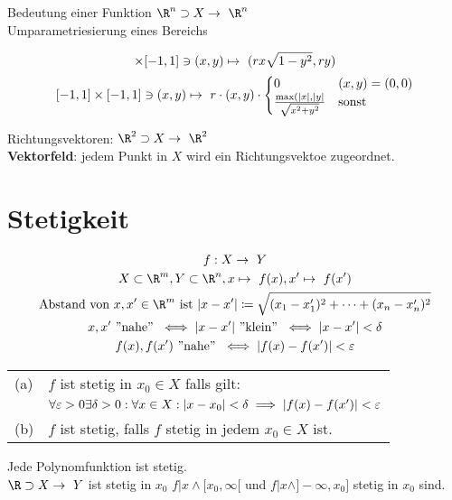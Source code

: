 Bedeutung einer Funktion $\R^n \supset X \rightarrow \R^n$\\
Umparametriesierung eines Bereichs\\
\begin{bsp*}[note = {Kreisscheibe $\subset \R^2 , x^2 + y^2 \leq r^2$}]
	\begin{gather*}
		[-1,1] \times [-1,1] \ni (x,y) \mapsto ( r x \sqrt{1-y^2} , r y )\\
		[-1,1] \times [-1,1] \ni (x,y) \mapsto r \cdot (x,y) \cdot \begin{cases}
			0									&(x,y) = (0,0)	\\
			\frac{\max( \abs{x} , \abs{y}}{\sqrt{x^2 + y^2}}	&\text{sonst}			
		\end{cases}
	\end{gather*}
\end{bsp*}
\begin{bsp*}[note = linearer Koordinatenwechsel]
\end{bsp*}

Richtungsvektoren:
$\R^2 \supset X \rightarrow \R^2$\\
\textbf{Vektorfeld}: jedem Punkt in $X$ wird ein Richtungsvektoe zugeordnet.\\
\begin{bsp*}[note = Geschwindigkeitsvektoe einer fliessender Flüssigkeit $\rightarrow$ Differentialgleichung]
\end{bsp*}

\section{Stetigkeit}
\begin{gather*}
	f: X \rightarrow Y \\
	X \subset \R^m , Y \subset \R^n , x \mapsto f(x) , x' \mapsto f(x')\\
	\text{Abstand von } x, x' \in \R ^m \text{ ist } \abs{x-x'} \coloneqq \sqrt{(x_1 - x'_1)^2 + \dots + (x_n - x'_n)^2} \\
	x, x' \text{ ''nahe'' } \iff \abs{x-x'} \text{ ''klein'' } \iff \abs{x-x'} < \delta \\
	f(x), f(x') \text{ ''nahe'' } \iff \abs{f(x) - f(x')} < \epsilon
\end{gather*}
\begin{def*}[note = Stetigkeit , index = Stetigkeit]
	\begin{tabular}{ll}
		(a)	&$f$ ist stetig in $x_0 \in X$ falls gilt:															\\
			&$\forall \epsilon > 0 \exists \delta > 0 : \forall x \in X : \abs{x-x_0} < \delta \implies \abs{f(x) - f(x')} < \epsilon$	\\
		(b)	&$f$ ist stetig, falls $f$ stetig in jedem $x_0 \in X$ ist.
	\end{tabular}
\end{def*}
\begin{fakt}
	Jede Polynomfunktion ist stetig. \\
	$\R \supset X \rightarrow Y$ ist stetig in $x_0$ \gdw $f|x \wedge [x_0,\infty[$ und $f|x \wedge ]-\infty,x_0]$ stetig in $x_0$ sind.
\end{fakt}

